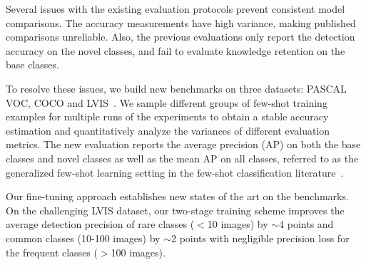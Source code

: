 Several issues with the existing evaluation protocols prevent consistent model comparisons. The accuracy measurements have high variance, making published comparisons unreliable.  Also, the previous evaluations only report the detection accuracy on the novel classes, and fail to evaluate knowledge retention on the base classes.

To resolve these issues, we build new benchmarks on three datasets: PASCAL VOC, COCO and LVIS~\cite{gupta2019lvis}.
We sample different groups of few-shot training examples for multiple runs of the experiments to obtain a stable accuracy estimation and quantitatively analyze the variances of different evaluation metrics. The new evaluation reports the average precision (AP) on both the base classes and novel classes as well as the mean AP on all classes, referred to as the generalized few-shot learning setting in the few-shot classification literature~\cite{hariharan2017low,wang2019tafe}.

Our fine-tuning approach establishes new states of the art on the benchmarks.  
On the challenging LVIS dataset, our two-stage training scheme improves the average detection precision of rare classes
($<$10 images) by $\sim$4 points and common classes (10-100 images) by $\sim$2 points with negligible precision loss for the frequent classes ($>$100 images). 
